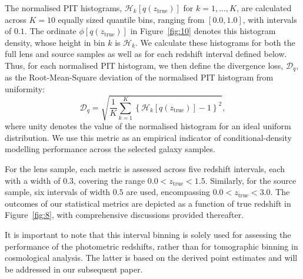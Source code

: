 The normalised PIT histograms, \( \mathcal{H}_k \left[ q \left( z_\mathrm{true} \right) \right] \) for \(k = 1, \ldots, K\), are calculated across \(K = 10\) equally sized quantile bins, ranging from \(\left[0.0, 1.0\right]\), with intervals of \(0.1\). The ordinate \(\phi[q(z_\mathrm{true})]\) in Figure~\ref{fig:10} denotes this histogram density, whose height in bin \(k\) is \(\mathcal{H}_k\). We calculate these histograms for both the full lens and source samples as well as for each redshift interval defined below. Thus, for each normalised PIT histogram, we then define the divergence loss, \(\mathcal{D}_q\), as the Root-Mean-Square deviation of the normalised PIT histogram from uniformity:
\begin{equation} \label{eqa:9}
    \mathcal{D}_q = \sqrt{\frac{1}{K} \sum_{k = 1}^{K} \left\{ \mathcal{H}_k \left[ q \left( z_\mathrm{true} \right) \right] - 1 \right\}^2},
\end{equation}
where unity denotes the value of the normalised histogram for an ideal uniform distribution. We use this metric as an empirical indicator of conditional-density modelling performance across the selected galaxy samples.

For the lens sample, each metric is assessed across five redshift intervals, each with a width of \(0.3\), covering the range \(0.0 < z_\mathrm{true} < 1.5\). Similarly, for the source sample, six intervals of width \(0.5\) are used, encompassing \(0.0 < z_\mathrm{true} < 3.0\). The outcomes of our statistical metrics are depicted as a function of true redshift in Figure~\ref{fig:8}, with comprehensive discussions provided thereafter.

It is important to note that this interval binning is solely used for assessing the performance of the photometric redshifts, rather than for tomographic binning in cosmological analysis. The latter is based on the derived point estimates and will be addressed in our subsequent paper.

